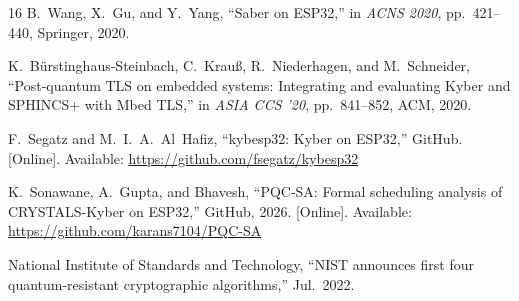 \documentclass[conference]{IEEEtran}
\begin{document}
\begin{thebibliography}{16}
B.~Wang, X.~Gu, and Y.~Yang, ``Saber on ESP32,'' in \emph{ACNS 2020}, pp.~421--440, Springer, 2020.

K.~B\"{u}rstinghaus-Steinbach, C.~Krau\ss, R.~Niederhagen, and M.~Schneider, ``Post-quantum TLS on embedded systems: Integrating and evaluating Kyber and SPHINCS+ with Mbed TLS,'' in \emph{ASIA CCS '20}, pp.~841--852, ACM, 2020.

F.~Segatz and M.~I.~A.~Al~Hafiz, ``kybesp32: Kyber on ESP32,'' GitHub. [Online]. Available: \url{https://github.com/fsegatz/kybesp32}

K.~Sonawane, A.~Gupta, and Bhavesh, ``PQC-SA: Formal scheduling analysis of CRYSTALS-Kyber on ESP32,'' GitHub, 2026. [Online]. Available: \url{https://github.com/karans7104/PQC-SA}

National Institute of Standards and Technology, ``NIST announces first four quantum-resistant cryptographic algorithms,'' Jul.\ 2022.

\end{thebibliography}
\end{document}
